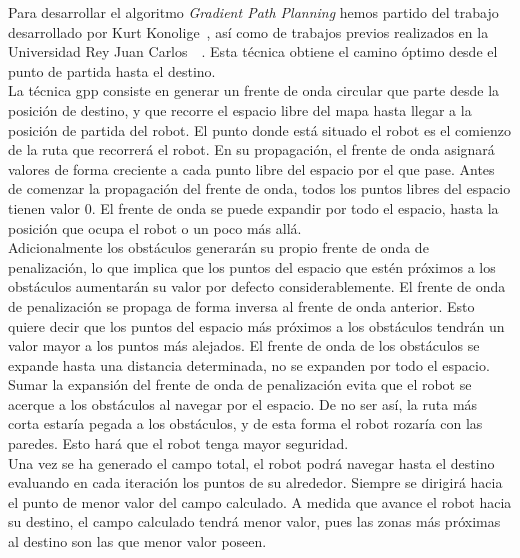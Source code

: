 Para desarrollar el algoritmo \textit{Gradient Path Planning} hemos partido del trabajo desarrollado por Kurt Konolige~\cite{gradient}, así como de trabajos previos realizados en la Universidad Rey Juan Carlos~\cite{navegacion_autolocalizacion3}~\cite{navegacion_autolocalizacion4}. Esta técnica obtiene el camino óptimo desde el punto de partida hasta el destino.\\

La técnica \acrshort{gpp} consiste en generar un frente de onda circular que parte desde la posición de destino, y que recorre el espacio libre del mapa hasta llegar a la posición de partida del robot. El punto donde está situado el robot es el comienzo de la ruta que recorrerá el robot. En su propagación, el frente de onda asignará valores de forma creciente a cada punto libre del espacio por el que pase. Antes de comenzar la propagación del frente de onda, todos los puntos libres del espacio tienen valor 0. El frente de onda se puede expandir por todo el espacio, hasta la posición que ocupa el robot o un poco más allá.\\

Adicionalmente los obstáculos generarán su propio frente de onda de penalización, lo que implica que los puntos del espacio que estén próximos a los obstáculos aumentarán su valor por defecto considerablemente. El frente de onda de penalización se propaga de forma inversa al frente de onda anterior. Esto quiere decir que los puntos del espacio más próximos a los obstáculos tendrán un valor mayor a los puntos más alejados. El frente de onda de los obstáculos se expande hasta una distancia determinada, no se expanden por todo el espacio.\\

Sumar la expansión del frente de onda de penalización evita que el robot se acerque a los obstáculos al navegar por el espacio. De no ser así, la ruta más corta estaría pegada a los obstáculos, y de esta forma el robot rozaría con las paredes. Esto hará que el robot tenga mayor seguridad.\\

Una vez se ha generado el campo total, el robot podrá navegar hasta el destino evaluando en cada iteración los puntos de su alrededor. Siempre se dirigirá hacia el punto de menor valor del campo calculado. A medida que avance el robot hacia su destino, el campo calculado tendrá menor valor, pues las zonas más próximas al destino son las que menor valor poseen.  \\

